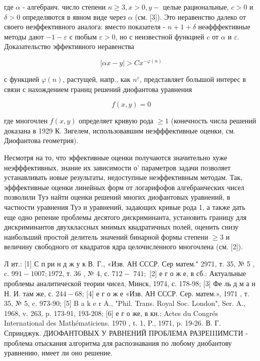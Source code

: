 \documentclass[10pt]{article}
\begin{document}
где $\alpha$ - алгебраич. число степени $n \geqslant 3, x>0, y-$ целые рациональные, $c>0$ и $\delta>0$ определяются в явном виде через $\alpha$ (см. [3]). Это неравенство далеко от своего неэффективного аналога: вместо показателя - $n+1+\delta$ неәфффективные методы дают $-1-\varepsilon$ с пюбым $\varepsilon>0$, но с неизвестной функцией $c$ от $\alpha$ и $\varepsilon$. Доказательство эффективного неравенства



\[

|\alpha x-y|>C x^{-\varphi(n)}

\]



с функцией $\varphi(n)$, растущей, напр., как $n^{\varepsilon}$, представляет болышой интерес в связи с нахождением границ решений диофантова уравнения



\[

f(x, y)=0

\]



где многочлен $f(x, y)$ определяет кривую рода $\geqslant 1$ (конечность числа решений доказана в 1929 К. Зигелем, использовавшим неэфффективные оценки, см. Диофантова геометрия).



Несмотря на то, что эффективные оценки получаются значительно хуже неэфффективных, знание их зависимости о' параметров задачи позволяет устанавливать новые результаты, недоступные неэффективным методам. Так, эфффективные оценки линейных форм от логарифофов алгебраических чисел позволили Туэ найти оценки решений многих диофантовых уравнений, в частности уравнения Туэ и уравнений, задающих кривые рода 1, а также дать еще одно репение проблемы десятого дискриминанта, установить границу для дискриминантов двухклассных мнимых квадратичных полей, оценить снизу наибольший простой делитель значений бинарной формы степени $\geqslant 3$ и величину свободного от квадратов ядра целочисленного многочлена (см. [2]).



Л ит.: [1] С п ри н д ж у к В. Г., «Изв. АН СССР. Сер матем." 2971, т. 35, № 5 , c. $991-1007 ; 1972$, т. 36 , № 4, с. $712-$ $741 ;$ [2] е г о ж е, в сб.: Актуальные проблемы аналитической теории чисел, Минск, 1974, с. 178-98; [3] Фе ль д м а н Н. И. там же, с. $244-68$; [4] е г о ж е «Изв. АН СССР. Сер. матем.», 1971 , т. 35, № 5, c. 973-90; [5] B a k e r A., "Phil. Trans. Royal Soc. London", Ser. A., 1968, v. 263, p. 173-91, 193-208; [6] е г о же, в кн.: Actes du Congrés International des Mathématiciens. 1970 , t. 1, P., 1971, p. 19-26. В. Г. Спринджук. ДИОФАНТОВЫХ У РАВНЕНИЙ ПРОБЛЕМА РАЗРЕIIIИМСТИ - проблема отыскания алгоритма для распознавания по любому диобантову уравнению, имеет ли оно решение.
\end{document}
